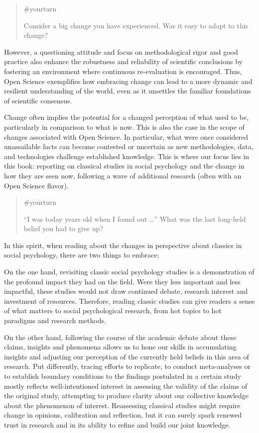 \documentclass[
  letterpaper,
]{book}
\begin{document}
\begin{quote}
{\#yourturn}

Consider a big change you have experienced. Was it easy to adapt to this
change?
\end{quote}

However, a questioning attitude and focus on methodological rigor and
good practice also enhance the robustness and reliability of scientific
conclusions by fostering an environment where continuous re-evaluation
is encouraged. Thus, Open Science exemplifies how embracing change can
lead to a more dynamic and resilient understanding of the world, even as
it unsettles the familiar foundations of scientific consensus.

Change often implies the potential for a changed perception of what used
to be, particularly in comparison to what is now. This is also the case
in the scope of changes associated with Open Science. In particular,
what were once considered unassailable facts can become contested or
uncertain as new methodologies, data, and technologies challenge
established knowledge. This is where our focus lies in this book:
reporting on classical studies in social psychology and the change in
how they are seen now, following a wave of additional research (often
with an Open Science flavor).

\begin{quote}
{\#yourturn}

``I was today years old when I found out \ldots{}'' What was the last
long-held belief you had to give up?
\end{quote}

In this spirit, when reading about the changes in perspective about
classics in social psychology, there are two things to embrace:

On the one hand, revisiting classic social psychology studies is a
demonstration of the profound impact they had on the field. Were they
less important and less impactful, these studies would not draw
continued debate, research interest and investment of resources.
Therefore, reading classic studies can give readers a sense of what
matters to social psychological research, from hot topics to hot
paradigms and research methods.

On the other hand, following the course of the academic debate about
these claims, insights and phenomena allows us to hone our skills in
accumulating insights and adjusting our perception of the currently held
beliefs in this area of research. Put differently, tracing efforts to
replicate, to conduct meta-analyses or to establish boundary conditions
to the findings postulated in a certain study mostly reflects
well-intentioned interest in assessing the validity of the claims of the
original study, attempting to produce clarity about our collective
knowledge about the phenomenon of interest. Reassessing classical
studies might require change in opinions, calibration and reflection,
but it can surely spark renewed trust in research and in its ability to
refine and build our joint knowledge.
\end{document}
